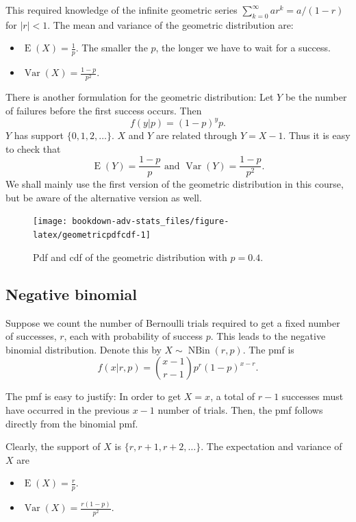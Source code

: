 \documentclass[
]{book}
\providecommand{\tightlist}{%
  \setlength{\itemsep}{0pt}\setlength{\parskip}{0pt}}
\DeclareMathOperator{\E}{E}
\DeclareMathOperator{\Var}{Var}
\DeclareMathOperator{\NBin}{NBin}
\theoremstyle{definition}
\theoremstyle{definition}
\theoremstyle{definition}
\theoremstyle{definition}
\theoremstyle{remark}
\begin{document}
This required knowledge of the infinite geometric series \(\sum_{k=0}^\infty ar^k = a/(1-r)\) for \(|r|<1\).
The mean and variance of the geometric distribution are:

\begin{itemize}
\tightlist
\item
  \(\E(X)=\frac{1}{p}\). The smaller the \(p\), the longer we have to wait for a success.
\item
  \(\Var(X)=\frac{1-p}{p^2}\).
\end{itemize}

There is another formulation for the geometric distribution: Let \(Y\) be the number of failures before the first success occurs. Then
\[
f(y|p) = (1-p)^yp.
\]
\(Y\) has support \(\{0,1,2,\dots\}\). \(X\) and \(Y\) are related through \(Y=X-1\). Thus it is easy to check
that
\[
\E(Y) = \frac{1-p}{p} \text{ and } \Var(Y)=\frac{1-p}{p^2}.
\]
We shall mainly use the first version of the geometric distribution in this course, but be aware of the alternative version as well.

\begin{figure}

{\centering \texttt{[image: bookdown-adv-stats\_files/figure-latex/geometricpdfcdf-1]} 

}

\caption{Pdf and cdf of the geometric distribution with \(p=0.4\).}\label{fig:geometricpdfcdf}
\end{figure}

\hypertarget{negative-binomial}{%
\subsection{Negative binomial}\label{negative-binomial}}

Suppose we count the number of Bernoulli trials required to get a fixed number of successes, \(r\), each with probability of success \(p\).
This leads to the negative binomial distribution.
Denote this by \(X\sim\NBin(r,p)\). The pmf is
\[
  f(x|r,p)= {x-1 \choose r-1} p^r (1-p)^{x-r}.
\]

The pmf is easy to justify: In order to get \(X=x\), a total of \(r-1\) successes must have occurred in the previous \(x-1\) number of trials. Then, the pmf follows directly from the binomial pmf.

Clearly, the support of \(X\) is \(\{r, r+1, r+2, \dots \}\).
The expectation and variance of \(X\) are

\begin{itemize}
\tightlist
\item
  \(\E(X)=\frac{r}{p}\).
\item
  \(\Var(X)=\frac{r(1-p)}{p^2}\).
\end{itemize}
\end{document}
